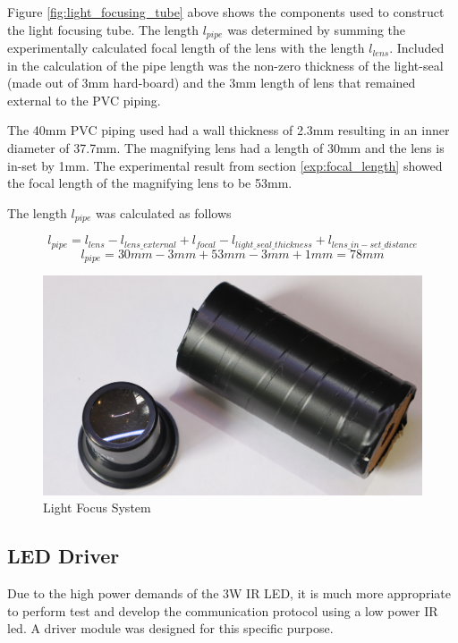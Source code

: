 Figure \ref{fig:light_focusing_tube} above shows the components used to construct the light focusing tube. The length $l_{pipe}$ was determined by summing the experimentally calculated focal length of the lens with the length $l_{lens}$. Included in the calculation of the pipe length was the non-zero thickness of the light-seal (made out of 3mm hard-board) and the 3mm length of lens that remained external to the PVC piping.

The 40mm PVC piping used had a wall thickness of 2.3mm resulting in an inner diameter of 37.7mm. The magnifying lens had a length of 30mm and the lens is in-set by 1mm. The experimental result from section \ref{exp:focal_length} showed the focal length of the magnifying lens to be 53mm.

The length $l_{pipe}$ was calculated as follows

\[l_{pipe} = l_{lens} - l_{lens\_external} + l_{focal} - l_{light\_seal\_thickness} + l_{lens\_in-set\_distance}\]
\[l_{pipe} = 30mm - 3mm + 53mm - 3mm + 1mm = 78mm\]


\begin{figure}[H]
	\centering
	\includegraphics[width=.6\textwidth]{figures/modules/light_focus_tube_lens.jpg}
	\caption{Light Focus System}
	\label{fig:module_light_focus}
\end{figure}

\subsection{LED Driver}

Due to the high power demands of the 3W IR LED, it is much more appropriate to perform test and develop the communication protocol using a low power IR led. A driver module was designed for this specific purpose.


